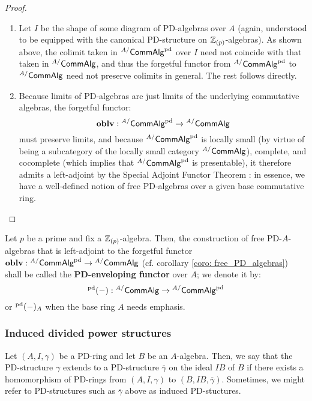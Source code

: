                     \begin{proof}
                        \noindent
                        \begin{enumerate}
                            \item Let $I$ be the shape of some diagram of PD-algebras over $A$ (again, understood to be equipped with the canonical PD-structure on $\mathbb{Z}_{(p)}$-algebras). As shown above, the colimit taken in ${}^{A/}\mathsf{Comm}\mathsf{Alg}^{\mathrm{pd}}$ over $I$ need not coincide with that taken in ${}^{A/}\mathsf{Comm}\mathsf{Alg}$, and thus the forgetful functor from ${}^{A/}\mathsf{Comm}\mathsf{Alg}^{\mathrm{pd}}$ to ${}^{A/}\mathsf{Comm}\mathsf{Alg}$ need not preserve colimits in general. The rest follows directly. 
                            \item Because limits of PD-algebras are just limits of the underlying commutative algebras, the forgetful functor:
                                $$\mathbf{oblv}: {}^{A/}\mathsf{Comm}\mathsf{Alg}^{\mathrm{pd}} \to {}^{A/}\mathsf{Comm}\mathsf{Alg}$$
                            must preserve limits, and because ${}^{A/}\mathsf{Comm}\mathsf{Alg}^{\mathrm{pd}}$ is locally small (by virtue of being a subcategory of the locally small category ${}^{A/}\mathsf{Comm}\mathsf{Alg}$), complete, and cocomplete (which implies that ${}^{A/}\mathsf{Comm}\mathsf{Alg}^{\mathrm{pd}}$ is presentable), it therefore admits a left-adjoint by the Special Adjoint Functor Theorem \cite[Theorem V.8.2]{maclane}: in essence, we have a well-defined notion of free PD-algebras over a given base commutative ring.   
                        \end{enumerate}
                    \end{proof}
                    
                \begin{definition}[PD-envelopes] \label{def: PD_envelopes}
                    Let $p$ be a prime and fix a $\mathbb{Z}_{(p)}$-algebra. Then, the construction of free PD-$A$-algebras that is left-adjoint to the forgetful functor $\mathbf{oblv}: {}^{A/}\mathsf{Comm}\mathsf{Alg}^{\mathrm{pd}} \to {}^{A/}\mathsf{Comm}\mathsf{Alg}$ (cf. corollary \ref{coro: free_PD_algebras}) shall be called the \textbf{PD-enveloping functor} over $A$; we denote it by:
                        $${}^{\mathrm{pd}}(-): {}^{A/}\mathsf{Comm}\mathsf{Alg} \to {}^{A/}\mathsf{Comm}\mathsf{Alg}^{\mathrm{pd}}$$
                    or ${}^{\mathrm{pd}}(-)_A$ when the base ring $A$ needs emphasis.
                \end{definition}
            
            \subsubsection{Induced divided power structures}
                \begin{definition}
                    Let $(A, I, \gamma)$ be a PD-ring and let $B$ be an $A$-algebra. Then, we say that the PD-structure $\gamma$ extends to a PD-structure $\overline{\gamma}$ on the ideal $IB$ of $B$ if there exists a homomorphism of PD-rings from $(A, I, \gamma)$ to $(B, IB, \overline{\gamma})$. Sometimes, we might refer to PD-structures such as $\overline{\gamma}$ above as induced PD-stuctures. 
                \end{definition}
                
